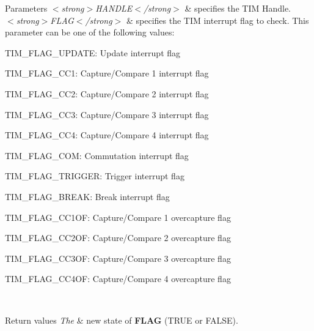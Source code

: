 \begin{DoxyParams}{Parameters}
{\em $<$strong$>$\+H\+A\+N\+D\+L\+E$<$/strong$>$} & specifies the T\+IM Handle. \\
\hline
{\em $<$strong$>$\+F\+L\+A\+G$<$/strong$>$} & specifies the T\+IM interrupt flag to check. This parameter can be one of the following values\+: \begin{DoxyItemize}
\item T\+I\+M\+\_\+\+F\+L\+A\+G\+\_\+\+U\+P\+D\+A\+TE\+: Update interrupt flag \item T\+I\+M\+\_\+\+F\+L\+A\+G\+\_\+\+C\+C1\+: Capture/\+Compare 1 interrupt flag \item T\+I\+M\+\_\+\+F\+L\+A\+G\+\_\+\+C\+C2\+: Capture/\+Compare 2 interrupt flag \item T\+I\+M\+\_\+\+F\+L\+A\+G\+\_\+\+C\+C3\+: Capture/\+Compare 3 interrupt flag \item T\+I\+M\+\_\+\+F\+L\+A\+G\+\_\+\+C\+C4\+: Capture/\+Compare 4 interrupt flag \item T\+I\+M\+\_\+\+F\+L\+A\+G\+\_\+\+C\+OM\+: Commutation interrupt flag \item T\+I\+M\+\_\+\+F\+L\+A\+G\+\_\+\+T\+R\+I\+G\+G\+ER\+: Trigger interrupt flag \item T\+I\+M\+\_\+\+F\+L\+A\+G\+\_\+\+B\+R\+E\+AK\+: Break interrupt flag \item T\+I\+M\+\_\+\+F\+L\+A\+G\+\_\+\+C\+C1\+OF\+: Capture/\+Compare 1 overcapture flag \item T\+I\+M\+\_\+\+F\+L\+A\+G\+\_\+\+C\+C2\+OF\+: Capture/\+Compare 2 overcapture flag \item T\+I\+M\+\_\+\+F\+L\+A\+G\+\_\+\+C\+C3\+OF\+: Capture/\+Compare 3 overcapture flag \item T\+I\+M\+\_\+\+F\+L\+A\+G\+\_\+\+C\+C4\+OF\+: Capture/\+Compare 4 overcapture flag \end{DoxyItemize}
\\
\hline
\end{DoxyParams}

\begin{DoxyRetVals}{Return values}
{\em The} & new state of {\bfseries F\+L\+AG} (T\+R\+UE or F\+A\+L\+SE). \\
\hline
\end{DoxyRetVals}
\mbox{\label{group___t_i_m___exported___macros_gabfeec6b3c67a5747c7dbd20aff61d8e2}} 
